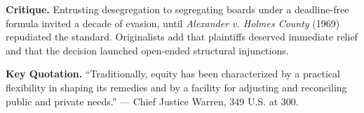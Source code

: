 \documentclass[12pt]{article}
\begin{document}
\textbf{Critique.} Entrusting desegregation to segregating boards under a deadline-free formula invited a decade of evasion, until \textit{Alexander v. Holmes County} (1969) repudiated the standard. Originalists add that plaintiffs deserved immediate relief and that the decision launched open-ended structural injunctions.

\textbf{Key Quotation.} ``Traditionally, equity has been characterized by a practical flexibility in shaping its remedies and by a facility for adjusting and reconciling public and private needs.'' --- Chief Justice Warren, 349 U.S. at 300.
\end{document}
